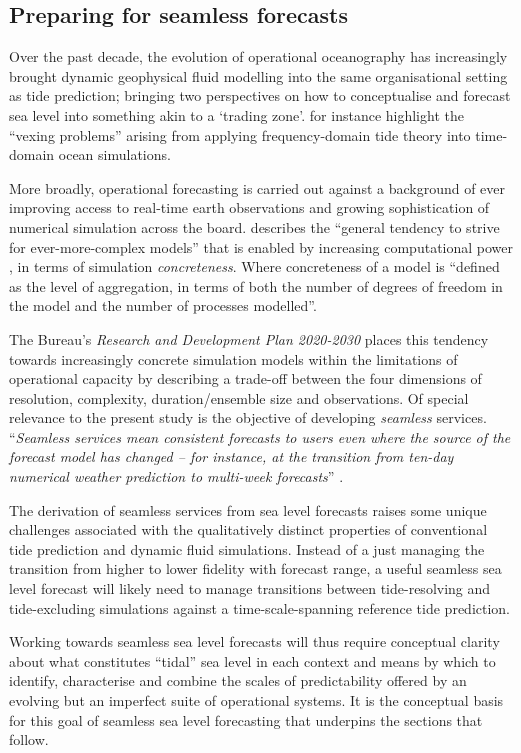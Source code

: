 \subsection{Preparing for seamless forecasts}
Over the past decade, the evolution of operational oceanography has increasingly brought dynamic geophysical fluid modelling into the same organisational setting as tide prediction\citep{10.1080/1755876x.2019.1685834};  bringing two perspectives on how to conceptualise and forecast sea level into something akin to a \citet{Galison:1996uc} `trading zone'.  \citet{Jayne:2001tr} for instance highlight the ``vexing problems'' arising from applying frequency-domain tide theory into time-domain ocean simulations.


More broadly, operational forecasting is carried out against a background of ever improving access to real-time earth observations and growing sophistication of numerical simulation across the board.
\citet{Petersen:2012tr} describes the ``general tendency to strive for ever-more-complex models'' that is enabled by increasing computational power , in terms of simulation \emph{concreteness}. Where concreteness of a model is ``defined as the level of aggregation, in terms of both the number of degrees of freedom in the model and the number of processes modelled''.

The Bureau's \textit{Research and Development Plan 2020-2030} places this tendency towards increasingly concrete simulation models within the limitations of operational capacity by describing a trade-off between the four dimensions of resolution, complexity, duration/ensemble size and observations. 
Of special relevance to the present study is the objective of developing \emph{seamless} services.  ``\textit{Seamless services mean consistent forecasts to users even where the source of the forecast model has changed – for instance, at the transition from ten-day numerical weather prediction to multi-week forecasts}'' \citep{BOM2020}.

The derivation of seamless services from sea level forecasts raises some unique challenges associated with the qualitatively distinct properties of conventional tide prediction and dynamic fluid simulations.
Instead of a just managing the transition from higher to lower fidelity with forecast range, a useful seamless sea level forecast will likely need to manage transitions between tide-resolving and tide-excluding simulations against a time-scale-spanning reference tide prediction.  


Working towards seamless sea level forecasts will thus require conceptual clarity about what constitutes ``tidal'' sea level in each context and means by which to identify, characterise and combine the scales of predictability offered by an evolving but an imperfect suite of operational systems.  
It is the conceptual basis for this goal of seamless sea level forecasting that underpins the sections that follow.

